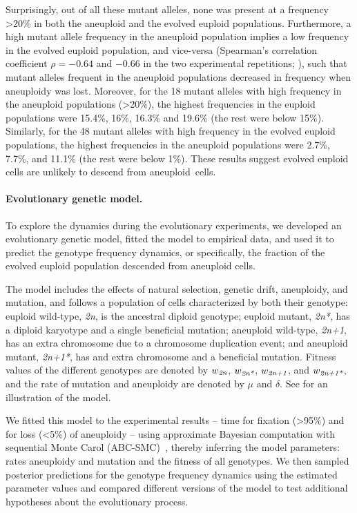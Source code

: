 \documentclass[12pt]{extarticle}
\newcommand{\euwt}{\emph{2n}}
\newcommand{\anwt}{\emph{2n+1}}
\newcommand{\eumt}{\emph{2n*}}
\newcommand{\anmt}{\emph{2n+1*}}
\begin{document}
Surprisingly, out of all these mutant alleles, none was present at a frequency >20\% in both the aneuploid and the evolved euploid populations. 
Furthermore, a high mutant allele frequency in the aneuploid population implies a low frequency in the evolved euploid population, and vice-versa (Spearman's correlation coefficient $\rho=-0.64$ and $-0.66$ in the two experimental repetitions; ), such that mutant alleles frequent in the aneuploid populations decreased in frequency when aneuploidy was lost.
Moreover, for the 18 mutant alleles with high frequency in the aneuploid populations (>20\%), the highest frequencies in the euploid populations were 15.4\%, 16\%, 16.3\% and 19.6\% (the rest were below 15\%).
Similarly, for the 48 mutant alleles with high frequency in the evolved euploid populations, the highest frequencies in the aneuploid populations were 2.7\%, 7.7\%, and 11.1\% (the rest were below 1\%). 
These results suggest evolved euploid cells are unlikely to descend from aneuploid~cells.


\paragraph{Evolutionary genetic model.} 
To explore the dynamics during the evolutionary experiments, we developed an evolutionary genetic model, fitted the model to empirical data, and used it to predict the genotype frequency dynamics, or specifically, the fraction of the evolved euploid population descended from aneuploid cells. 

The model includes the effects of natural selection, genetic drift, aneuploidy, and mutation, and follows a population of cells characterized by both their genotype: 
euploid wild-type, \euwt, is the ancestral diploid genotype; 
euploid mutant, \eumt, has a diploid karyotype and a single beneficial mutation; 
aneuploid wild-type, \anwt, has an extra chromosome due to a chromosome duplication event; and
aneuploid mutant, \anmt, has and extra chromosome and a beneficial mutation.
Fitness values of the different genotypes are denoted by $w_{\euwt}$, $w_{\eumt}$, $w_{\anwt}$, and $w_{\anmt}$, and the rate of mutation and aneuploidy are denoted by $\mu$ and $\delta$. See  for an illustration of the model.

We fitted this model to the experimental results\citep{Yona2012} -- time for fixation (>95\%) and for loss (<5\%) of aneuploidy -- using approximate Bayesian computation with sequential Monte Carol (ABC-SMC)~\citep{Sisson2009}, thereby inferring the model parameters: rates aneuploidy and mutation and the fitness of all genotypes.
We then sampled posterior predictions for the genotype frequency dynamics using the estimated parameter values and compared different versions of the model to test additional hypotheses about the evolutionary process.
\end{document}

